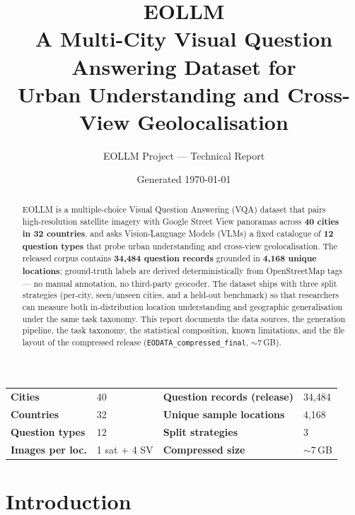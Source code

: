 \documentclass[11pt,a4paper]{article}
\title{\vspace{-1.2cm}\textcolor{eollmblue}{\textbf{EOLLM}}\\
       \large A Multi-City Visual Question Answering Dataset for\\
       Urban Understanding and Cross-View Geolocalisation}
\author{EOLLM Project --- Technical Report}
\date{Generated \today}
\begin{document}
\maketitle
\thispagestyle{empty}
\vspace{-1em}

\begin{abstract}
\noindent
EOLLM is a multiple-choice Visual Question Answering (VQA) dataset that pairs
high-resolution satellite imagery with Google Street View panoramas
across \textbf{40 cities in 32 countries}, and asks Vision-Language Models
(VLMs) a fixed catalogue of \textbf{12 question types} that probe urban
understanding and cross-view geolocalisation. The released corpus contains
\textbf{34{,}484 question records} grounded in \textbf{4{,}168 unique
locations}; ground-truth labels are derived deterministically from
OpenStreetMap tags --- no manual annotation, no third-party geocoder. The
dataset ships with three split strategies (per-city, seen/unseen cities, and
a held-out benchmark) so that researchers can measure both
in-distribution location understanding and geographic generalisation under
the same task taxonomy. This report documents the data sources, the
generation pipeline, the task taxonomy, the statistical composition, known
limitations, and the file layout of the compressed release
(\texttt{EODATA\_compressed\_final}, $\sim$7\,GB).
\end{abstract}

\begin{infobox}[At a glance]
\begin{tabularx}{\linewidth}{@{}lXlX@{}}
\textbf{Cities}            & 40   & \textbf{Question records (release)} & 34{,}484 \\
\textbf{Countries}         & 32   & \textbf{Unique sample locations}    & 4{,}168 \\
\textbf{Question types}    & 12   & \textbf{Split strategies}           & 3 \\
\textbf{Images per loc.}   & 1 sat + 4 SV & \textbf{Compressed size}    & $\sim$7\,GB \\
\end{tabularx}
\end{infobox}

\tableofcontents
\newpage

\section{Introduction}
\end{document}
